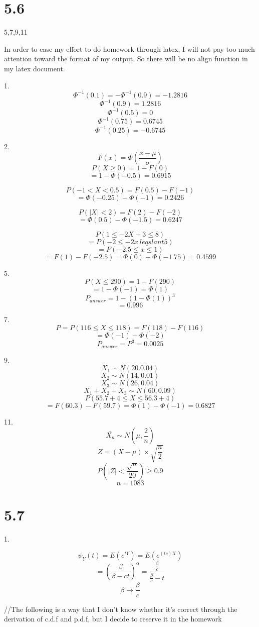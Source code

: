 \documentclass[12pt, a4paper, twocolumn]{article}
\begin{document}
\section*{5.6}

5,7,9,11

In order to ease my effort to do homework through latex, I will not pay too much attention toward the format of my output. So there will be no align function in my latex document. 

1.
$$\Phi^{-1}(0.1) = -\Phi^{-1}(0.9) = -1.2816$$
$$\Phi^{-1}(0.9) = 1.2816$$
$$\Phi^{-1}(0.5) = 0$$
$$\Phi^{-1}(0.75) = 0.6745$$
$$\Phi^{-1}(0.25) = -0.6745$$

2.
$$F(x) = \Phi(\frac{x - \mu}{\sigma})$$
$$P(X \geqslant 0) = 1 - F(0) $$
$$= 1 - \Phi(-0.5) = 0.6915$$

$$P(-1 < X < 0.5) = F(0.5) - F(-1) $$
$$ = \Phi(-0.25) - \Phi(-1) = 0.2426$$

$$P(|X| < 2) = F(2) - F(-2)$$
$$=\Phi(0.5) - \Phi(-1.5) = 0.6247$$

$$P(1\leqslant -2X + 3 \leqslant 8)$$
$$ = P(-2 \leqslant -2x \ leqslant 5)$$
$$ = P(-2.5 \leqslant x \leqslant 1)$$
$$ = F(1) - F(-2.5) = \Phi(0) - \Phi(-1.75) = 0.4599$$

5.
$$P(X \leqslant 290) = 1 - F(290)$$
$$ = 1 - \Phi(-1) = \Phi(1)$$
$$P_{answer} = 1 - (1 - \Phi(1))^3$$
$$ = 0.996$$


7.
$$P = P(116\leqslant X \leqslant 118) = F(118) - F(116)$$
$$=\Phi(-1) - \Phi(-2)$$
$$P_{answer} = P^3 = 0.0025$$

9.
$$X_1 \sim N(20. 0.04)$$
$$X_2 \sim N(14, 0.01)$$
$$X_3 \sim N(26, 0.04)$$
$$X_1 + X_2 + X_3 \sim N(60, 0.09)$$
$$P(55.7 + 4 \leqslant X \leqslant 56.3 + 4)$$
$$ = F(60.3) - F(59.7) = \Phi(1) - \Phi(-1) = 0.6827$$

11.
$$\bar{X_n} \sim N(\mu, \frac{2}{n})$$
$$Z = (X - \mu) \times \sqrt{\frac{n}{2}}$$
$$P(|Z|<\frac{\sqrt{n}}{20}) \geqslant 0.9$$
$$ n = 1083$$

\section*{5.7}
1.

$$\psi_Y(t)= E(e^{tY}) = E(e^{(tc)X})$$
$$=(\frac{\beta}{\beta - ct})^\alpha = \frac{\frac{\beta}{c}}{\frac{\beta}{c} - t}$$
$$\beta \rightarrow \frac{\beta}{c}$$

//The following is a way that I don't know whether it's correct through the derivation of c.d.f and p.d.f, but I decide to reserve it in the homework
\end{document}
